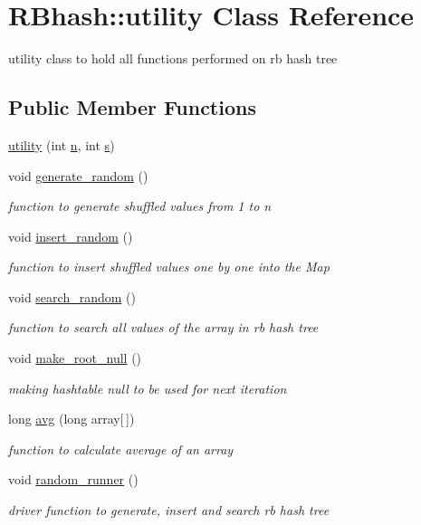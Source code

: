 \hypertarget{class_r_bhash_1_1utility}{\section{R\-Bhash\-:\-:utility Class Reference}
\label{class_r_bhash_1_1utility}
}


utility class to hold all functions performed on rb hash tree  


\subsection*{Public Member Functions}
\begin{DoxyCompactItemize}
\item 
\hyperlink{class_r_bhash_1_1utility_ae76de95e6fb70f51fa627fb236fadd51}{utility} (int \hyperlink{class_r_bhash_1_1utility_aa3e63fea701cf99046aeab691ba4da41}{n}, int \hyperlink{class_r_bhash_1_1utility_a5674754a0754872a1c2a2931f5495a21}{s})
\item 
void \hyperlink{class_r_bhash_1_1utility_a8b7ff7afd8c99718648a9650b098f26a}{generate\-\_\-random} ()
\begin{DoxyCompactList}\small\item\em function to generate shuffled values from 1 to n \end{DoxyCompactList}\item 
void \hyperlink{class_r_bhash_1_1utility_aef5b38b496a85789fe78f40e3c0d3d3f}{insert\-\_\-random} ()
\begin{DoxyCompactList}\small\item\em function to insert shuffled values one by one into the Map \end{DoxyCompactList}\item 
void \hyperlink{class_r_bhash_1_1utility_aa1f8ffc0fdb60237c60c9d7bb8fb2922}{search\-\_\-random} ()
\begin{DoxyCompactList}\small\item\em function to search all values of the array in rb hash tree \end{DoxyCompactList}\item 
void \hyperlink{class_r_bhash_1_1utility_ade83d8589891e215e53676e746f87020}{make\-\_\-root\-\_\-null} ()
\begin{DoxyCompactList}\small\item\em making hashtable null to be used for next iteration \end{DoxyCompactList}\item 
long \hyperlink{class_r_bhash_1_1utility_a618e63aee8f444ec3e4af0483b590d99}{avg} (long array\mbox{[}$\,$\mbox{]})
\begin{DoxyCompactList}\small\item\em function to calculate average of an array \end{DoxyCompactList}\item 
void \hyperlink{class_r_bhash_1_1utility_aa978a65e2cce337f10ef6ecdb7a08ad9}{random\-\_\-runner} ()
\begin{DoxyCompactList}\small\item\em driver function to generate, insert and search rb hash tree \end{DoxyCompactList}\end{DoxyCompactItemize}
